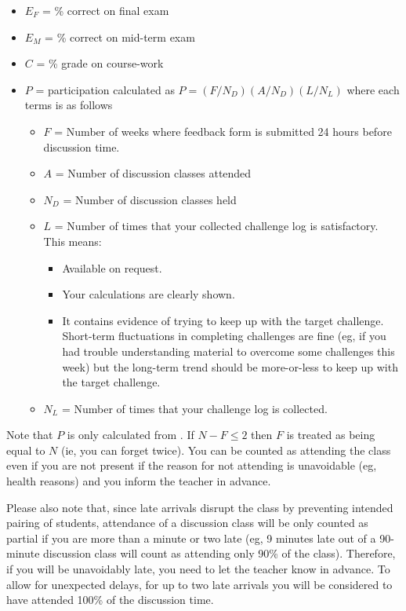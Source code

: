 \begin{itemize}
    \item $E_F$ = \% correct on final exam
    \item $E_M$ = \% correct on mid-term exam
    \item $C$ = \% grade on course-work
    \item $P$ = participation calculated as $P = (F/N_D)(A/N_D)(L/N_L)$ where each terms is as follows
        \begin{itemize}
            \item $F$ = Number of weeks where feedback form is submitted 24 hours before discussion time.
            \item $A$ = Number of discussion classes attended
            \item $N_D$ = Number of discussion classes held
            \item $L$ = Number of times that your collected challenge log is satisfactory. This means:
                \begin{itemize}
                    \item Available on request.
                    \item Your calculations are clearly shown.
                    \item It contains evidence of trying to keep up with the target challenge. Short-term fluctuations in completing challenges are fine (eg, if you had trouble understanding material to overcome some challenges this week) but the long-term trend should be more-or-less to keep up with the target challenge.
                \end{itemize}
            \item $N_L$ = Number of times that your challenge log is collected.
        \end{itemize}
\end{itemize}

Note that $P$ is only calculated from \assstart. If $N - F \le 2$ then $F$ is treated as being equal to $N$ (ie, you can forget twice). You can be counted as attending the class even if you are not present if the reason for not attending is unavoidable (eg, health reasons) and you inform the teacher in advance.

Please also note that, since late arrivals disrupt the class by preventing intended pairing of students, attendance of a discussion class will be only counted as partial if you are more than a minute or two late (eg, 9 minutes late out of a 90-minute discussion class will count as attending only 90\% of the class). Therefore, if you will be unavoidably late, you need to let the teacher know in advance. To allow for unexpected delays, for up to two late arrivals you will be considered to have attended 100\% of the discussion time.



